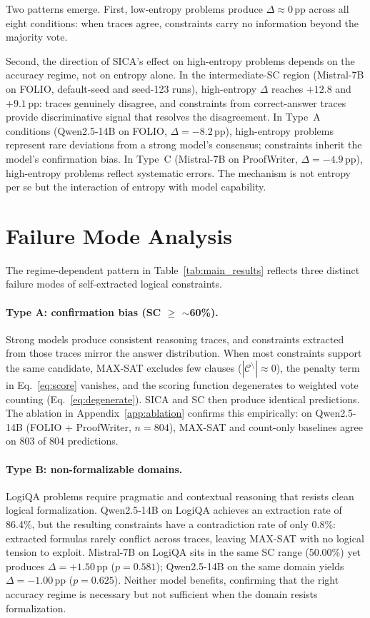 Two patterns emerge. First, low-entropy problems produce $\Delta \approx 0$\,pp across all eight conditions: when traces agree, constraints carry no information beyond the majority vote.

Second, the direction of SICA's effect on high-entropy problems depends on the accuracy regime, not on entropy alone. In the intermediate-SC region (Mistral-7B on FOLIO, default-seed and seed-123 runs), high-entropy $\Delta$ reaches $+12.8$ and $+9.1$\,pp: traces genuinely disagree, and constraints from correct-answer traces provide discriminative signal that resolves the disagreement. In Type~A conditions (Qwen2.5-14B on FOLIO, $\Delta = -8.2$\,pp), high-entropy problems represent rare deviations from a strong model's consensus; constraints inherit the model's confirmation bias. In Type~C (Mistral-7B on ProofWriter, $\Delta = -4.9$\,pp), high-entropy problems reflect systematic errors. The mechanism is not entropy per se but the interaction of entropy with model capability.


\section{Failure Mode Analysis}
\label{app:failure-modes}
\label{sec:failure-modes}

The regime-dependent pattern in Table~\ref{tab:main_results} reflects three distinct failure modes of self-extracted logical constraints.

\paragraph{Type A: confirmation bias (SC $\geq$ $\sim$60\%).} Strong models produce consistent reasoning traces, and constraints extracted from those traces mirror the answer distribution. When most constraints support the same candidate, MAX-SAT excludes few clauses ($|\mathcal{C}^{\setminus}| \approx 0$), the penalty term in Eq.~\ref{eq:score} vanishes, and the scoring function degenerates to weighted vote counting (Eq.~\ref{eq:degenerate}). SICA and SC then produce identical predictions. The ablation in Appendix~\ref{app:ablation} confirms this empirically: on Qwen2.5-14B (FOLIO + ProofWriter, $n = 804$), MAX-SAT and count-only baselines agree on 803 of 804 predictions.

\paragraph{Type B: non-formalizable domains.} LogiQA problems require pragmatic and contextual reasoning that resists clean logical formalization. Qwen2.5-14B on LogiQA achieves an extraction rate of 86.4\%, but the resulting constraints have a contradiction rate of only 0.8\%: extracted formulas rarely conflict across traces, leaving MAX-SAT with no logical tension to exploit. Mistral-7B on LogiQA sits in the same SC range (50.00\%) yet produces $\Delta = +1.50$\,pp ($p = 0.581$); Qwen2.5-14B on the same domain yields $\Delta = -1.00$\,pp ($p = 0.625$). Neither model benefits, confirming that the right accuracy regime is necessary but not sufficient when the domain resists formalization.

